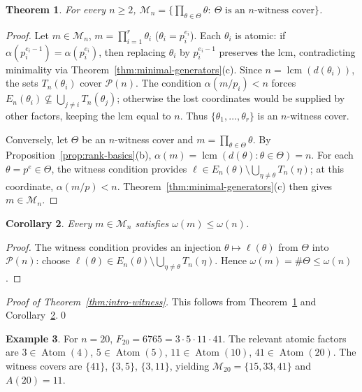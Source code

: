 \documentclass[11pt,letterpaper]{article}
\numberwithin{equation}{section}
\theoremstyle{plain}
\newtheorem{theorem}{Theorem}[section]
\newtheorem{corollary}[theorem]{Corollary}
\theoremstyle{definition}
\newtheorem{example}[theorem]{Example}
\theoremstyle{remark}
\DeclareMathOperator{\lcmop}{lcm}
\DeclareMathOperator{\Atom}{Atom}
\begin{document}
\begin{theorem}\label{thm:witness-classification}
For every $n\ge 2$,
$\mathcal M_n=\bigl\{\prod_{\theta\in\Theta}\theta:\
\Theta\text{ is an $n$-witness cover}\bigr\}$.
\end{theorem}

\begin{proof}
Let $m\in\mathcal M_n$, $m=\prod_{i=1}^r\theta_i$ ($\theta_i=p_i^{e_i}$).
Each $\theta_i$ is atomic: if $\alpha(p_i^{e_i-1})=\alpha(p_i^{e_i})$, then
replacing $\theta_i$ by $p_i^{e_i-1}$ preserves the lcm, contradicting
minimality via Theorem~\ref{thm:minimal-generators}(c). Since
$n=\lcmop(d(\theta_i))$, the sets $T_n(\theta_i)$ cover $\mathcal P(n)$. The
condition $\alpha(m/p_i)<n$ forces
$E_n(\theta_i)\nsubseteq\bigcup_{j\neq i}T_n(\theta_j)$; otherwise the lost
coordinates would be supplied by other factors, keeping the lcm equal to $n$.
Thus $\{\theta_1,\dots,\theta_r\}$ is an $n$-witness cover.

Conversely, let $\Theta$ be an $n$-witness cover and
$m=\prod_{\theta\in\Theta}\theta$. By
Proposition~\ref{prop:rank-basics}(b), $\alpha(m)=\lcmop(d(\theta):
\theta\in\Theta)=n$. For each $\theta=p^e\in\Theta$, the witness condition
provides $\ell\in E_n(\theta)\setminus\bigcup_{\eta\neq\theta}T_n(\eta)$; at
this coordinate, $\alpha(m/p)<n$.
Theorem~\ref{thm:minimal-generators}(c) then gives $m\in\mathcal M_n$.
\end{proof}

\begin{corollary}\label{cor:support-bound}
Every $m\in\mathcal M_n$ satisfies $\omega(m)\le\omega(n)$.
\end{corollary}

\begin{proof}
The witness condition provides an injection
$\theta\mapsto\ell(\theta)$ from $\Theta$ into $\mathcal P(n)$: choose
$\ell(\theta)\in E_n(\theta)\setminus\bigcup_{\eta\neq\theta}T_n(\eta)$.
Hence $\omega(m)=\#\Theta\le\omega(n)$.
\end{proof}

\noindent\emph{Proof of Theorem~\ref{thm:intro-witness}.}
This follows from Theorem~\ref{thm:witness-classification} and
Corollary~\ref{cor:support-bound}.\qed

\begin{example}\label{ex:n20}
For $n=20$, $F_{20}=6765=3\cdot 5\cdot 11\cdot 41$. The relevant atomic
factors are $3\in\Atom(4)$, $5\in\Atom(5)$, $11\in\Atom(10)$,
$41\in\Atom(20)$. The witness covers are $\{41\}$, $\{3,5\}$, $\{3,11\}$,
yielding $\mathcal M_{20}=\{15,33,41\}$ and $A(20)=11$.
\end{example}
\end{document}
